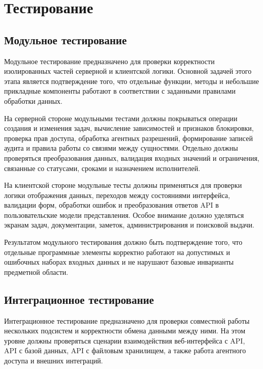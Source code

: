 \section{Тестирование}

\subsection{Модульное тестирование}

\headingtextsep

Модульное тестирование предназначено для проверки корректности изолированных частей серверной и клиентской логики. Основной задачей этого этапа является подтверждение того, что отдельные функции, методы и небольшие прикладные компоненты работают в соответствии с заданными правилами обработки данных.

На серверной стороне модульными тестами должны покрываться операции создания и изменения задач, вычисление зависимостей и признаков блокировки, проверка прав доступа, обработка агентных разрешений, формирование записей аудита и правила работы со связями между сущностями. Отдельно должны проверяться преобразования данных, валидация входных значений и ограничения, связанные со статусами, сроками и назначением исполнителей.

На клиентской стороне модульные тесты должны применяться для проверки логики отображения данных, переходов между состояниями интерфейса, валидации форм, обработки ошибок и преобразования ответов API в пользовательские модели представления. Особое внимание должно уделяться экранам задач, документации, заметок, администрирования и поисковой выдачи.

Результатом модульного тестирования должно быть подтверждение того, что отдельные программные элементы корректно работают на допустимых и ошибочных наборах входных данных и не нарушают базовые инварианты предметной области.

\textheadingsep
\subsection{Интеграционное тестирование}

\headingtextsep

Интеграционное тестирование предназначено для проверки совместной работы нескольких подсистем и корректности обмена данными между ними. На этом уровне должны проверяться сценарии взаимодействия веб-интерфейса с API, API с базой данных, API с файловым хранилищем, а также работа агентного доступа и внешних интеграций.

